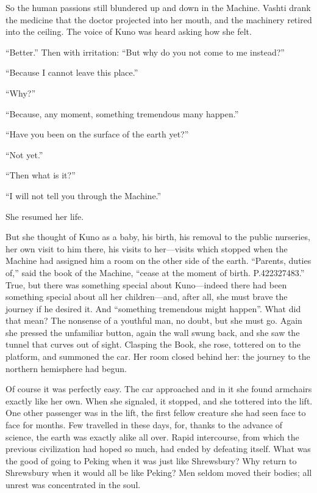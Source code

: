So the human passions still blundered up and down in the Machine. Vashti drank the medicine that the doctor projected into her mouth, and the machinery retired into the ceiling. The voice of Kuno was heard asking how she felt.

``Better.'' Then with irritation: ``But why do you not come to me instead?''

``Because I cannot leave this place.''

``Why?''

``Because, any moment, something tremendous many happen.''

``Have you been on the surface of the earth yet?''

``Not yet.''

``Then what is it?''

``I will not tell you through the Machine.''

She resumed her life.

But she thought of Kuno as a baby, his birth, his removal to the public nurseries, her own visit to him there, his visits to her---visits which stopped when the Machine had assigned him a room on the other side of the earth. ``Parents, duties of,'' said the book of the Machine, ``cease at the moment of birth. P.422327483.'' True, but there was something special about Kuno---indeed there had been something special about all her children---and, after all, she must brave the journey if he desired it. And ``something tremendous might happen''. What did that mean? The nonsense of a youthful man, no doubt, but she must go. Again she pressed the unfamiliar button, again the wall swung back, and she saw the tunnel that curves out of sight. Clasping the Book, she rose, tottered on to the platform, and summoned the car. Her room closed behind her: the journey to the northern hemisphere had begun.

Of course it was perfectly easy. The car approached and in it she found armchairs exactly like her own. When she signaled, it stopped, and she tottered into the lift. One other passenger was in the lift, the first fellow creature she had seen face to face for months. Few travelled in these days, for, thanks to the advance of science, the earth was exactly alike all over. Rapid intercourse, from which the previous civilization had hoped so much, had ended by defeating itself. What was the good of going to Peking when it was just like Shrewsbury? Why return to Shrewsbury when it would all be like Peking? Men seldom moved their bodies; all unrest was concentrated in the soul.

